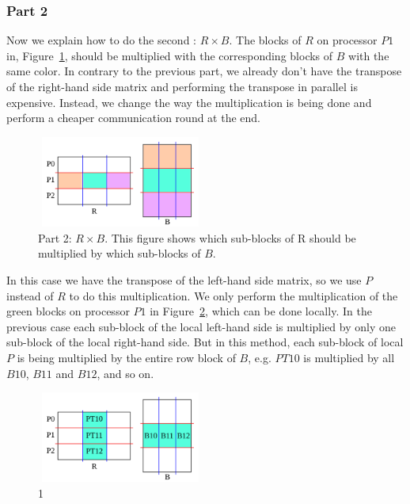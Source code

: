 \subsubsection{Part 2}

Now we explain how to do the second \mm: $R \times B$. The blocks of $R$ on processor $P1$ in, Figure~\ref{fig:part2d}, should be multiplied with the corresponding blocks of $B$ with the same color. In contrary to the previous part, we already don't have the transpose of the right-hand side matrix and performing the transpose in parallel is expensive. Instead, we change the way the multiplication is being done and perform a cheaper communication round at the end.

\begin{figure}[tbh]
 \centering
 \includegraphics[width=5.5cm,height=3cm]{./figures/part2d.pdf}
 \caption{Part 2: $R \times B$. This figure shows which sub-blocks of R should be multiplied by which sub-blocks of $B$.}
 \label{fig:part2d}
\end{figure}

In this case we have the transpose of the left-hand side matrix, so we use $P$ instead of $R$ to do this multiplication.
We only perform the multiplication of the green blocks on processor $P1$ in Figure~\ref{fig:part2e}, which can be done locally.
%
In the previous case each sub-block of the local left-hand side is multiplied by only one sub-block of the local right-hand side.
But in this method, each sub-block of local $P$ is being multiplied by the entire row block of $B$, e.g. $PT10$ is multiplied by all $B10$, $B11$ and $B12$, and so on.

\begin{figure}[tbh]
 \centering
 \includegraphics[width=5.5cm,height=3cm]{./figures/part2e.pdf}
 \caption{1}
 \label{fig:part2e}
\end{figure}

